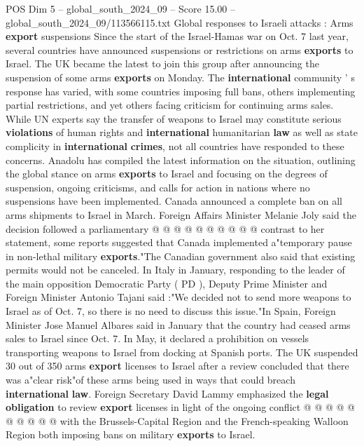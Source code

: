 \begin{textsample}{POS Dim 5 – global\_south\_2024\_09 – Score 15.00 – global\_south\_2024\_09/113566115.txt}  \label{ex:f5_pos_235}
Global responses to Israeli attacks : Arms \textbf{export} suspensions Since the start of the Israel-Hamas war on Oct. 7 last year, several countries have announced suspensions or restrictions on arms \textbf{exports} to Israel.
The UK became the latest to join this group after announcing the suspension of some arms \textbf{exports} on Monday.
The \textbf{international} community ' s response has varied, with some countries imposing full bans, others implementing partial restrictions, and yet others facing criticism for continuing arms sales.
While UN experts say the transfer of weapons to Israel may constitute serious \textbf{violations} of human rights and \textbf{international} humanitarian \textbf{law} as well as state complicity in \textbf{international} \textbf{crimes}, not all countries have responded to these concerns.
Anadolu has compiled the latest information on the situation, outlining the global stance on arms \textbf{exports} to Israel and focusing on the degrees of suspension, ongoing criticisms, and calls for action in nations where no suspensions have been implemented.
Canada announced a complete ban on all arms shipments to Israel in March.
Foreign Affairs Minister Melanie Joly said the decision followed a parliamentary @ @ @ @ @ @ @ @ @ @ contrast to her statement, some reports suggested that Canada implemented a"temporary pause in non-lethal military \textbf{exports}."The Canadian government also said that existing permits would not be canceled.
In Italy in January, responding to the leader of the main opposition Democratic Party ( PD ), Deputy Prime Minister and Foreign Minister Antonio Tajani said :"We decided not to send more weapons to Israel as of Oct. 7, so there is no need to discuss this issue."In Spain, Foreign Minister Jose Manuel Albares said in January that the country had ceased arms sales to Israel since Oct. 7.
In May, it declared a prohibition on vessels transporting weapons to Israel from docking at Spanish ports.
The UK suspended 30 out of 350 arms \textbf{export} licenses to Israel after a review concluded that there was a"clear risk"of these arms being used in ways that could breach \textbf{international} \textbf{law}.
Foreign Secretary David Lammy emphasized the \textbf{legal} \textbf{obligation} to review \textbf{export} licenses in light of the ongoing conflict @ @ @ @ @ @ @ @ @ @ with the Brussels-Capital Region and the French-speaking Walloon Region both imposing bans on military \textbf{exports} to Israel.

\end{textsample}
